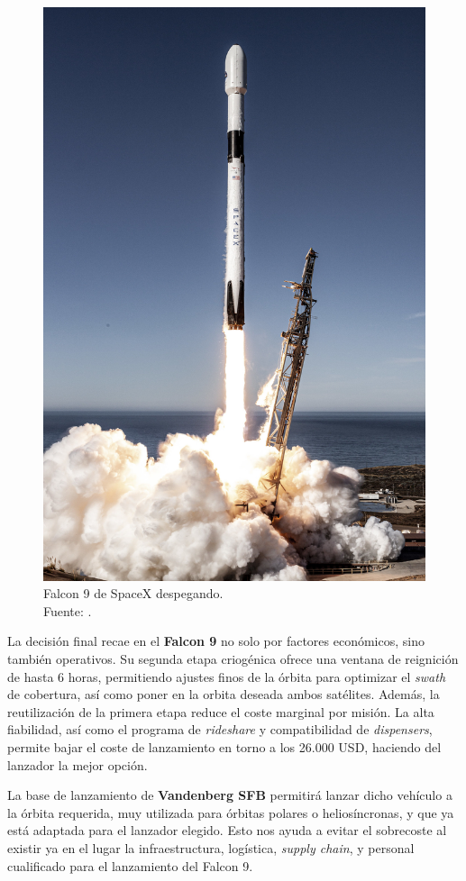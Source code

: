 \begin{figure}[H]
\begin{minipage}[t]{0.5\textwidth}
        \includegraphics[width=0.8\linewidth]{6.Lanzadores/Copernicus_Sentinel-6_lifts_off_on_a_SpaceX_Falcon_9_rocket-3548914818.jpg}
        \caption{Falcon 9 de SpaceX despegando.\\ Fuente: \cite{wikipedia2024}.}
        \label{fig:imagen2}
    \end{minipage}
\end{figure}

La decisión final recae en el \textbf{Falcon 9} no solo por factores económicos, sino también operativos. Su segunda etapa criogénica ofrece una ventana de reignición de hasta 6 horas, permitiendo ajustes finos de la órbita para optimizar el \textit{swath} de cobertura, así como poner en la orbita deseada ambos satélites. Además, la reutilización de la primera etapa reduce el coste marginal por misión. La alta fiabilidad, así como el programa de \textit{rideshare} y compatibilidad de \textit{dispensers}, permite bajar el coste de lanzamiento en torno a los 26.000 USD, haciendo del lanzador la mejor opción.

La base de lanzamiento de \textbf{Vandenberg SFB} permitirá lanzar dicho vehículo a la órbita requerida, muy utilizada para órbitas polares o heliosíncronas, y que ya está adaptada para el lanzador elegido. Esto nos ayuda a evitar el sobrecoste al existir ya en el lugar la infraestructura, logística, \textit{supply chain}, y personal cualificado para el lanzamiento del Falcon 9.
\newpage

